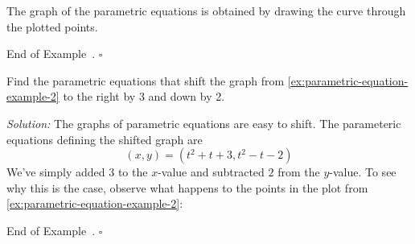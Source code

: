 \documentclass[10pt]{article}
\theoremstyle{definition}
\newtheorem{example}[theorem]{Example}
\renewenvironment{example}
{\begin{oldexample}}
  {\par\smallskip\hfill   End of Example~\theexample. $\square$    \par\end{oldexample}}
\newcommand{\1}[1]{\textbf{1}_{\left[#1\right]}} %
\def\blue{\color{Blue}}
\begin{document}
\begin{max-comment}
\begin{example}
\begin{center}
  \end{center}
  The graph of the parametric equations is obtained by drawing the curve through the plotted points.
\end{example}

\begin{example}
  Find the parametric equations that shift the graph from \cref{ex:parametric-equation-example-2} to the right by 3 and
  down by 2.

  \textit{Solution:} The graphs of parametric equations are easy to shift. The parameteric equations defining the
  shifted graph are
  \begin{equation*}
    (x,y) = (t^{2}+t+3, t^{2}-t -2)
  \end{equation*}
  We've simply added 3 to the $x$-value and subtracted $2$ from the $y$-value. To see why this is the case, observe what
  happens to the points in the plot from \cref{ex:parametric-equation-example-2}:
  \begin{center}
\end{center}
\end{example}
\end{max-comment}
\end{document}
